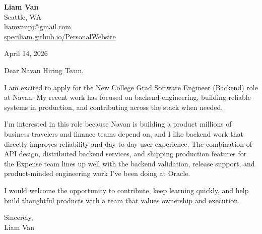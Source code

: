 \documentclass[letterpaper,11pt]{article}
\begin{document}
\begin{flushleft}
\textbf{\Large Liam Van} \\
Seattle, WA \\
\href{mailto:liamvanpj@gmail.com}{liamvanpj@gmail.com} \\
\href{https://speciliam.github.io/PersonalWebsite}{speciliam.github.io/PersonalWebsite}
\end{flushleft}

April 14, 2026

\noindent Dear Navan Hiring Team,

\noindent I am excited to apply for the New College Grad Software Engineer (Backend) role at Navan. My recent work has focused on backend engineering, building reliable systems in production, and contributing across the stack when needed.

\noindent I'm interested in this role because Navan is building a product millions of business travelers and finance teams depend on, and I like backend work that directly improves reliability and day-to-day user experience. The combination of API design, distributed backend services, and shipping production features for the Expense team lines up well with the backend validation, release support, and product-minded engineering work I've been doing at Oracle.

\noindent I would welcome the opportunity to contribute, keep learning quickly, and help build thoughtful products with a team that values ownership and execution.

\noindent Sincerely, \\
Liam Van
\end{document}
